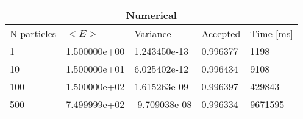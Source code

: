 \begin{tabular}{|l|l|l|l|l|}
\hline 
\multicolumn{5}{|c|}{Numerical}\\ 
\hline 
N particles & $<E>$ & Variance & Accepted & Time [ms]\\ 
 \hline 
1 & 1.500000e+00 & 1.243450e-13 & 0.996377 & 1198 \\ 
\hline10 & 1.500000e+01 & 6.025402e-12 & 0.996434 & 9108 \\ 
\hline100 & 1.500000e+02 & 1.615263e-09 & 0.996397 & 429843 \\ 
\hline500 & 7.499999e+02 & -9.709038e-08 & 0.996334 & 9671595 \\ 
\hline\end{tabular}